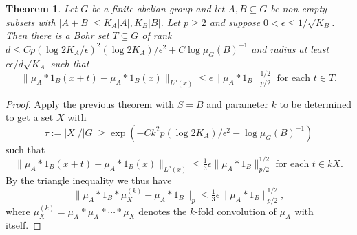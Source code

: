 \documentclass[12pt,a4paper,reqno]{amsart}
\numberwithin{equation}{section}
\theoremstyle{plain}
\newtheorem{theorem}[subsection]{Theorem}
\theoremstyle{definition}
\renewcommand{\leq}{\leqslant}
\renewcommand{\geq}{\geqslant}
\renewcommand{\subset}{\subseteq}
\providecommand{\abs}[1]{\lvert#1\rvert}
\providecommand{\norm}[1]{\lVert #1 \rVert}
\theoremstyle{plain}
\begin{document}
\begin{theorem}\label{thm:strong_lp}
Let $G$ be a finite abelian group and let $A, B \subset G$ be non-empty subsets with $\abs{A+B} \leq K_A\abs{A}, K_B\abs{B}$. Let $p \geq 2$ and suppose $0 < \epsilon \leq 1/\sqrt{K_B}$. Then there is a Bohr set $T \subset G$ of rank $d \leq C p (\log 2K_A/\epsilon)^2 (\log 2K_A)/\epsilon^2 + C\log{\mu_G(B)^{-1}}$ and radius at least $c\epsilon/d\sqrt{K_A}$ such that
\[ \norm{ \mu_A*1_B(x+t) - \mu_A*1_B(x) }_{L^p(x)} \leq \epsilon \norm{ \mu_A*1_B }_{p/2}^{1/2} \text{ for each $t \in T$}. \]
\end{theorem}
\begin{proof}
Apply the previous theorem with $S = B$ and parameter $k$ to be determined to get a set $X$ with
\[ \tau := \abs{X}/\abs{G} \geq \exp\left(-C k^2 p (\log 2K_A)/\epsilon^2 - \log{ \mu_G(B)^{-1}} \right) \]
such that 
\[ \norm{ \mu_A*1_B(x+t) - \mu_A*1_B(x) }_{L^p(x)} \leq \tfrac{1}{3}\epsilon \norm{ \mu_A*1_B }_{p/2}^{1/2} \text{ for each $t \in k X$}. \]
By the triangle inequality we thus have
\[ \norm{ \mu_A*1_B*\mu_X^{(k)} - \mu_A*1_B }_p \leq \tfrac{1}{3}\epsilon \norm{ \mu_A*1_B }_{p/2}^{1/2}, \]
where $\mu_X^{(k)} = \mu_X*\mu_X*\cdots*\mu_X$ denotes the $k$-fold convolution of $\mu_X$ with itself.


\end{proof}
\end{document}
